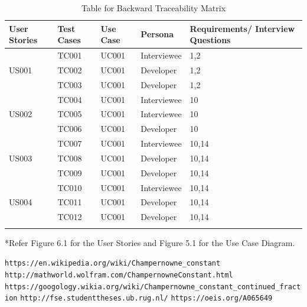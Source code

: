 \documentclass[12pt, a4paper]{report}
\begin{document}
\begin{longtable}{|p{2.5cm}|p{2cm}|p{2cm}|p{2cm}|p{4cm}|}

    \hline
    \textbf{User Stories} & \textbf{Test Cases} & \textbf{Use Case} & \textbf{Persona} & \textbf{Requirements/ Interview Questions} \\\hline
   \multirow{3}{0pt}{US001} & TC001 & UC001 & Interviewee & 1,2 \\\cline{2-5}
   & TC002 & UC001 & Developer & 1,2 \\\cline{2-5}
   & TC003 & UC001  & Developer & 1,2 \\\hline
   \multirow{3}{}{US002} & TC004 & UC001 & Interviewee & 10 \\\cline{2-5}
   & TC005 & UC001 & Interviewee & 10 \\\cline{2-5}
   & TC006 & UC001 & Developer & 10 \\\hline
   \multirow{3}{}{US003} & TC007 & UC001  & Interviewee & 10,14 \\\cline{2-5}
   & TC008 & UC001 & Developer & 10,14 \\\cline{2-5}
   & TC009 & UC001 & Developer & 10,14 \\\hline
   \multirow{3}{}{US004} & TC010 & UC001  & Interviewee & 10,14 \\\cline{2-5}
   & TC011 & UC001 & Developer & 10,14 \\\cline{2-5}
   & TC012 & UC001 & Developer & 10,14 \\\hline
\caption{Table for Backward Traceability Matrix}
\label{table:1}
\end{longtable}
{*Refer Figure 6.1 for the User Stories and Figure 5.1 for the Use Case Diagram.}

\begin{thebibliography}{9}
    \texttt{https://en.wikipedia.org/wiki/Champernowne{\_}constant}
    \texttt{http://mathworld.wolfram.com/ChampernowneConstant.html}
    \texttt{https://googology.wikia.org/wiki/Champernowne{\_}constant{\_}continued{\_}fraction}
    \texttt{http://fse.studenttheses.ub.rug.nl/}
    \texttt{https://oeis.org/A065649}
\end{thebibliography}
\end{document}
